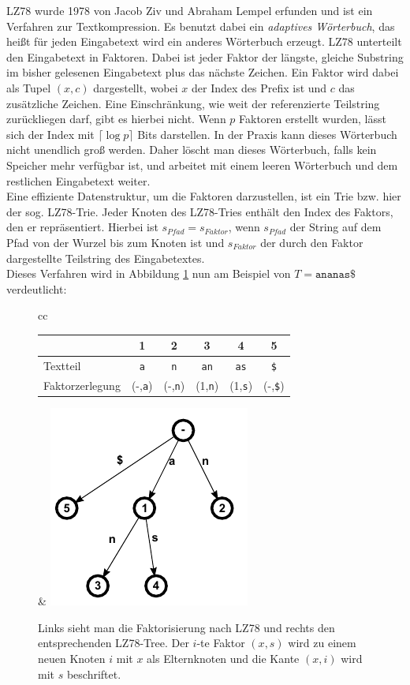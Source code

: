 \documentclass[a4paper,11pt]{scrartcl}%
\theoremstyle{change}
\theoremstyle{nonumberplain}
\theoremstyle{change}
\theoremstyle{nonumberplain}
\theoremstyle{change}
\theoremstyle{nonumberplain}
\begin{document}
LZ78 wurde 1978 von Jacob Ziv und Abraham Lempel erfunden und ist ein Verfahren zur Textkompression. Es benutzt dabei ein \textit{adaptives Wörterbuch}, das heißt für jeden Eingabetext wird ein anderes Wörterbuch erzeugt. LZ78 unterteilt den Eingabetext in Faktoren. Dabei ist jeder Faktor der längste, gleiche Substring im bisher gelesenen Eingabetext plus das nächste Zeichen. Ein Faktor wird dabei als Tupel $(x,c)$ dargestellt, wobei $x$ der Index des Prefix ist und $c$ das zusätzliche Zeichen. Eine Einschränkung, wie weit der referenzierte Teilstring zurückliegen darf, gibt es hierbei nicht. Wenn $p$ Faktoren erstellt wurden, lässt sich der Index mit $\lceil\log p\rceil$ Bits darstellen. In der Praxis kann dieses Wörterbuch nicht unendlich groß werden. Daher löscht man dieses Wörterbuch, falls kein Speicher mehr verfügbar ist, und arbeitet mit einem leeren Wörterbuch und dem restlichen Eingabetext weiter.\\
Eine effiziente Datenstruktur, um die Faktoren darzustellen, ist ein Trie bzw. hier der sog. LZ78-Trie. Jeder Knoten des LZ78-Tries enthält den Index des Faktors, den er repräsentiert. Hierbei ist $s_{Pfad} = s_{Faktor}$, wenn $s_{Pfad}$ der String auf dem Pfad von der Wurzel bis zum Knoten ist und $s_{Faktor}$ der durch den Faktor dargestellte Teilstring des Eingabetextes.\cite[S.225]{bellTextCompression}\\
Dieses Verfahren wird in Abbildung \ref{fig:lz78} nun am Beispiel von $T = \texttt{ananas\$}$ verdeutlicht:

 	
	\begin{figure}[h]
	\begin{tabular}[t]{cc}
		\begin{tabular}[b]{l c c c c c}\hline
			& 1 & 2 & 3 & 4 & 5 \\ \hline
		   Textteil & \texttt{a} & \texttt{n} & \texttt{an} & \texttt{as} & \texttt{\$}\\ \hline
		   Faktorzerlegung & (-,\texttt{a}) & (-,\texttt{n}) & (1,\texttt{n}) & (1,\texttt{s}) &  (-,\texttt{\$})\\ \hline
		\end{tabular} & \includegraphics{./pics/ananas_LZ78Tree}
	\end{tabular}
	\caption{Links sieht man die Faktorisierung nach LZ78 und rechts den entsprechenden LZ78-Tree. Der $i$-te Faktor $(x,s)$ wird zu einem neuen Knoten $i$ mit $x$ als Elternknoten und die Kante $(x,i)$ wird mit $s$ beschriftet.}
	\label{fig:lz78}
	\end{figure}
\end{document}
